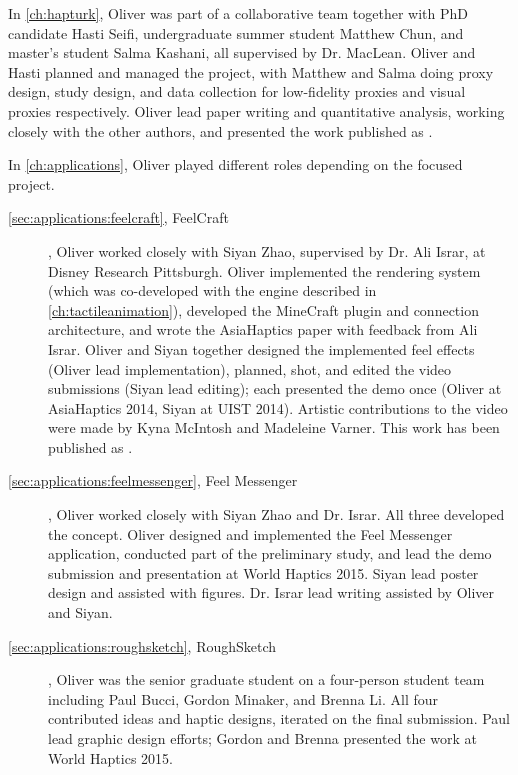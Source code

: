 In \autoref{ch:hapturk}, Oliver was part of a collaborative team together with PhD candidate Hasti Seifi, undergraduate summer student Matthew Chun, and master's student Salma Kashani, all supervised by Dr. MacLean.
Oliver and Hasti planned and managed the project, with Matthew and Salma doing proxy design, study design, and data collection for low-fidelity proxies and visual proxies respectively.
Oliver lead paper writing and quantitative analysis, working closely with the other authors, and presented the work published as \citet{Schneider2016hapturk}.

In \autoref{ch:applications}, Oliver played different roles depending on the focused project.
\begin{description}

\item[\autoref{sec:applications:feelcraft}, FeelCraft], Oliver worked closely with Siyan Zhao, supervised by Dr. Ali Israr, at Disney Research Pittsburgh.
Oliver implemented the rendering system (which was co-developed with the engine described in \autoref{ch:tactileanimation}), developed the MineCraft plugin and connection architecture, and wrote the AsiaHaptics paper with feedback from Ali Israr.
Oliver and Siyan together designed the implemented feel effects (Oliver lead implementation), planned, shot, and edited the video submissions (Siyan lead editing); each presented the demo once (Oliver at AsiaHaptics 2014, Siyan at UIST 2014).
Artistic contributions to the video were made by Kyna McIntosh and Madeleine Varner.
This work has been published as \citet{SchneiderAsiaHaptics2014,Schneider-demo-feelcraftUIST2014}.

\item[\autoref{sec:applications:feelmessenger}, Feel Messenger], Oliver worked closely with Siyan Zhao and Dr. Israr.
All three developed the concept.
Oliver designed and implemented the Feel Messenger application, conducted part of the preliminary study, and lead the demo submission and presentation at World Haptics 2015.
Siyan lead poster design and assisted with figures.
Dr. Israr lead writing assisted by Oliver and Siyan.


\item[\autoref{sec:applications:roughsketch}, RoughSketch], Oliver was the senior graduate student on a four-person student team including Paul Bucci, Gordon Minaker, and Brenna Li.
All four contributed ideas and haptic designs, iterated on the final submission.
Paul lead graphic design efforts; Gordon and Brenna presented the work at World Haptics 2015.


\end{description}
